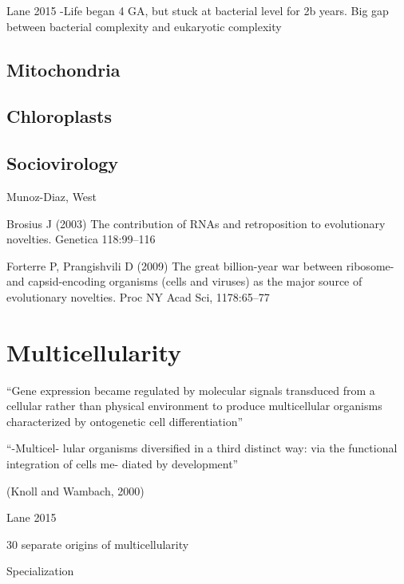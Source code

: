 \documentclass{tufte-book} %
\begin{document}
Lane 2015
-Life began 4 GA, but stuck at bacterial level for 2b years. Big gap between bacterial complexity and eukaryotic complexity


\section{Mitochondria}\label{mitochondria}

\section{Chloroplasts}\label{chloroplast}

\section{Sociovirology}\label{socioviro}

Munoz-Diaz, West


Brosius J (2003) The contribution of RNAs and retroposition to evolutionary novelties. Genetica 118:99–116

Forterre P, Prangishvili D (2009) The great billion-year war between ribosome- and capsid-encoding organisms
(cells and viruses) as the major source of evolutionary novelties. Proc NY Acad Sci, 1178:65–77




\chapter{Multicellularity}\label{multicell}

“Gene expression became regulated by molecular signals transduced from a cellular rather than physical environment to produce multicellular organisms characterized by ontogenetic cell differentiation” 

“-Multicel- lular organisms diversified in a third distinct way: via the functional integration of cells me- diated by development”

(Knoll and Wambach, 2000)

Lane 2015

30 separate origins of multicellularity 

Specialization
\end{document}
